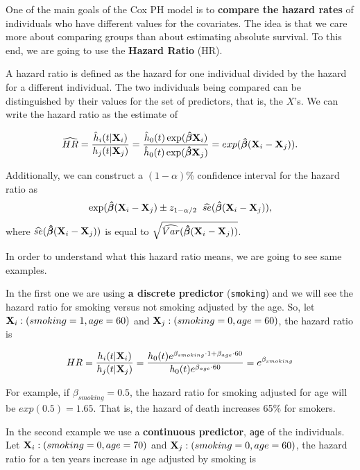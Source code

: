 \documentclass[]{book}
\theoremstyle{definition}
\theoremstyle{definition}
\theoremstyle{definition}
\theoremstyle{remark}
\begin{document}
One of the main goals of the Cox PH model is to \textbf{compare the
hazard rates} of individuals who have different values for the
covariates. The idea is that we care more about comparing groups than
about estimating absolute survival. To this end, we are going to use the
\textbf{Hazard Ratio} (HR).

A hazard ratio is defined as the hazard for one individual divided by
the hazard for a different individual. The two individuals being
compared can be distinguished by their values for the set of predictors,
that is, the \(X\)'s. We can write the hazard ratio as the estimate of

\[
\widehat{HR} = \frac{\hat h_i(t|\textbf X_i)}{h_j(t|\textbf X_j)} = \frac{\hat h_0(t) \exp (\boldsymbol{\hat \beta} \textbf X_i)}{\hat h_0(t) \exp (\boldsymbol{\hat \beta}\textbf X_j)}=exp(\boldsymbol{\hat \beta}(\textbf X_i - \textbf X_j)).
\]

Additionally, we can construct a \((1-\alpha)\)\% confidence interval
for the hazard ratio as \[
\exp( \boldsymbol{\hat \beta}(\textbf X_i - \textbf X_j) \pm z_{1-\alpha/2} \hspace{0.2cm} \widehat{se}(\boldsymbol{\hat \beta}(\textbf X_i - \textbf X_j)), 
\] where
\(\widehat{se}(\boldsymbol{\hat \beta}(\textbf X_i - \textbf X_j))\) is
equal to
\(\sqrt{ \widehat{Var}(\boldsymbol{\hat \beta}(\textbf X_i - \textbf X_j))}\).

In order to understand what this hazard ratio means, we are going to see
same examples.

In the first one we are using \textbf{a discrete predictor}
(\texttt{smoking}) and we will see the hazard ratio for smoking versus
not smoking adjusted by the age. So, let
\(\textbf X_i:(smoking=1, age = 60)\) and
\(\textbf X_j:(smoking=0, age = 60)\), the hazard ratio is

\[
HR= \frac{h_i(t|\textbf X_i)}{h_j(t|\textbf X_j)} = \frac{h_0(t) e^{\beta_{smoking} \cdot 1 + \beta_{age} \cdot 60}}{h_0(t) e^{\beta_{age} \cdot 60}} = e^ {\beta_{smoking}}
\]

For example, if \(\beta_{smoking}= 0.5\), the hazard ratio for smoking
adjusted for age will be \(exp(0.5)= 1.65\). That is, the hazard of
death increases 65\% for smokers.

In the second example we use a \textbf{continuous predictor},
\texttt{age} of the individuals. Let
\(\textbf X_i:(smoking=0, age = 70)\) and
\(\textbf X_j:(smoking=0, age = 60)\), the hazard ratio for a ten years
increase in age adjusted by smoking is
\end{document}
